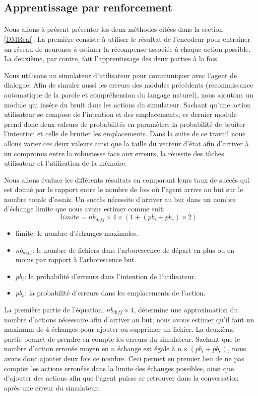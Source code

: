 \subsection{Apprentissage par renforcement}
\paragraph{}Nous allons à présent présenter les deux méthodes citées dans la section \ref{DMReal}. La première consiste à utiliser le résultat de l'encodeur pour entraîner un réseau de neurones à estimer la récompense associée à chaque action possible. La deuxième, par contre, fait l'apprentissage des deux parties à la fois.
\par Nous utilisons un simulateur d'utilisateur pour communiquer avec l'agent de dialogue. Afin de simuler aussi les erreurs des modules précédents (reconnaissance automatique de la parole et compréhension du langage naturel), nous ajoutons un module qui insère du bruit dans les actions du simulateur. Sachant qu'une action utilisateur se compose de l'intention et des emplacements, ce dernier module prend donc deux valeurs de probabilités en paramètre; la probabilité de bruiter l'intention et celle de bruiter les emplacements. Dans la suite de ce travail nous allons varier ces deux valeurs ainsi que la taille du vecteur d'état afin d'arriver à un compromis entre la robustesse face aux erreurs, la réussite des tâches utilisateur et l'utilisation de la mémoire.
\par Nous allons évaluer les différents résultats en comparant leurs taux de succès qui est donné par le rapport entre le nombre de fois où l'agent arrive au but sur le nombre totale d'essais. Un succès nécessite d'arriver au but dans un nombre d'échange limite que nous avons estimer comme suit: 
\[limite = nb_{diff} \times 4 \times (1 + (pb_i + pb_e) \times 2) \]
\begin{itemize}
	\item limite: le nombre d'échanges maximales.
	\item $nb_{diff}$: le nombre de fichiers dans l'arborescence de départ en plus ou en moins par rapport à l'arborescence but.
	\item $pb_i$: la probabilité d'erreurs dans l'intention de l'utilisateur.
	\item $pb_e$: la probabilité d'erreurs dans les emplacements de l'action.
\end{itemize}
\par La première partie de l'équation, $nb_{diff} \times 4$, détermine une approximation du nombre d'actions nécessaire afin d'arriver au but; nous avons estimer qu'il faut un maximum de 4 échanges pour ajouter ou supprimer un fichier. La deuxième partie permet de prendre en compte les erreurs du simulateur. Sachant que le nombre d'action erronée moyen en $n$ échange est égale à $n \times (pb_i + pb_e)$, nous avons donc ajouter deux fois ce nombre. Ceci permet en premier lieu de ne pas compter les actions erronées dans la limite des échanges possibles, ainsi que d'ajouter des actions afin que l'agent puisse se retrouver dans la conversation après une erreur du simulateur.
